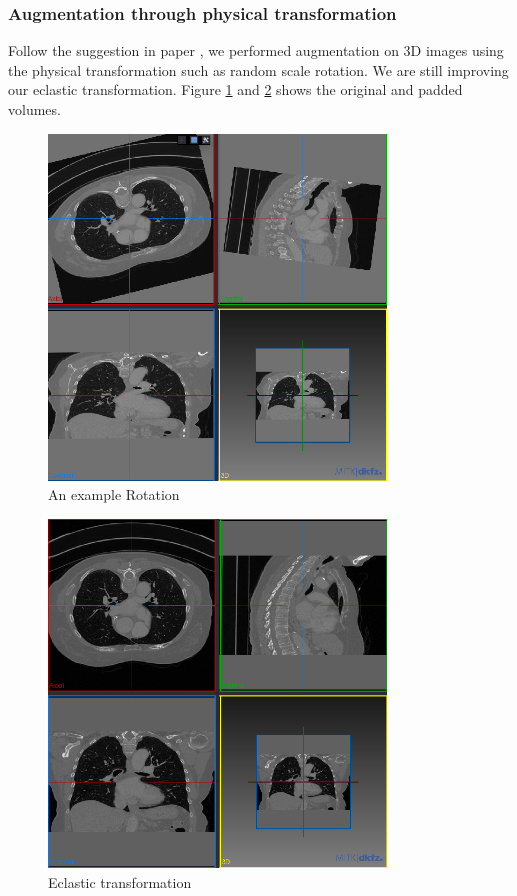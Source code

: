 \subsubsection*{Augmentation through physical transformation}
Follow the suggestion in paper \cite{zhang_when_2019}, we performed augmentation on 3D images using the physical transformation such as random scale rotation. We are still improving our eclastic transformation. Figure \ref{fig:rotation} and \ref{fig:eclastic} shows the original and padded volumes.
\begin{figure}
\centering
\includegraphics[width = 0.8\textwidth]{img/rotation.png}
\caption{An example Rotation}
\label{fig:rotation}
\end{figure}

\begin{figure}
\centering
\includegraphics[width = 0.8\textwidth]{img/eclastic.png}
\caption{Eclastic transformation}
\label{fig:eclastic}
\end{figure}

